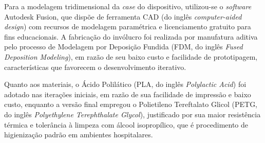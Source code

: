 
Para a modelagem tridimensional da \textit{case} do dispositivo, utilizou-se o \textit{software} Autodesk Fusion, que dispõe de ferramenta CAD (do inglês \textit{computer-aided design}) com recursos de modelagem paramétrica e licenciamento gratuito para fins educacionais. A fabricação do invólucro foi realizada por manufatura aditiva pelo processo de Modelagem por Deposição Fundida (FDM, do inglês \textit{Fused Deposition Modeling}), em razão de seu baixo custo e facilidade de prototipagem, características que favorecem o desenvolvimento iterativo.

Quanto aos materiais, o Ácido Polilático (PLA, do inglês \textit{Polylactic Acid}) foi adotado nas iterações iniciais, em razão de sua facilidade de impressão e baixo custo, enquanto a versão final empregou o Polietileno Tereftalato Glicol (PETG, do inglês \textit{Polyethylene Terephthalate Glycol}), justificado por sua maior resistência térmica e tolerância à limpeza com álcool isopropílico, que é procedimento de higienização padrão em ambientes hospitalares.



